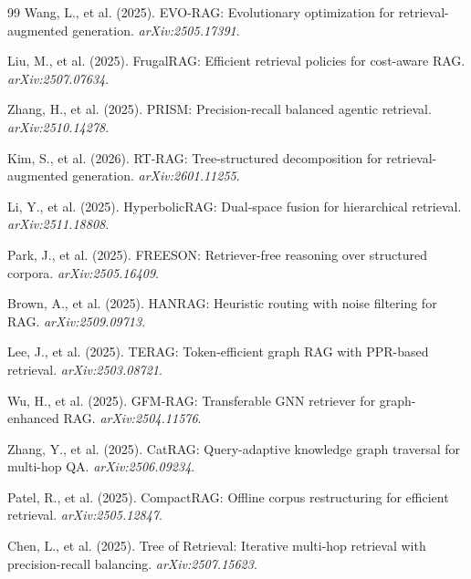 \documentclass[11pt,a4paper]{article}
\begin{document}
\begin{thebibliography}{99}
Wang, L., et al. (2025).
EVO-RAG: Evolutionary optimization for retrieval-augmented generation.
\textit{arXiv:2505.17391}.

Liu, M., et al. (2025).
FrugalRAG: Efficient retrieval policies for cost-aware RAG.
\textit{arXiv:2507.07634}.

Zhang, H., et al. (2025).
PRISM: Precision-recall balanced agentic retrieval.
\textit{arXiv:2510.14278}.

Kim, S., et al. (2026).
RT-RAG: Tree-structured decomposition for retrieval-augmented generation.
\textit{arXiv:2601.11255}.

Li, Y., et al. (2025).
HyperbolicRAG: Dual-space fusion for hierarchical retrieval.
\textit{arXiv:2511.18808}.

Park, J., et al. (2025).
FREESON: Retriever-free reasoning over structured corpora.
\textit{arXiv:2505.16409}.

Brown, A., et al. (2025).
HANRAG: Heuristic routing with noise filtering for RAG.
\textit{arXiv:2509.09713}.

Lee, J., et al. (2025).
TERAG: Token-efficient graph RAG with PPR-based retrieval.
\textit{arXiv:2503.08721}.

Wu, H., et al. (2025).
GFM-RAG: Transferable GNN retriever for graph-enhanced RAG.
\textit{arXiv:2504.11576}.

Zhang, Y., et al. (2025).
CatRAG: Query-adaptive knowledge graph traversal for multi-hop QA.
\textit{arXiv:2506.09234}.

Patel, R., et al. (2025).
CompactRAG: Offline corpus restructuring for efficient retrieval.
\textit{arXiv:2505.12847}.

Chen, L., et al. (2025).
Tree of Retrieval: Iterative multi-hop retrieval with precision-recall balancing.
\textit{arXiv:2507.15623}.

\end{thebibliography}
\end{document}
